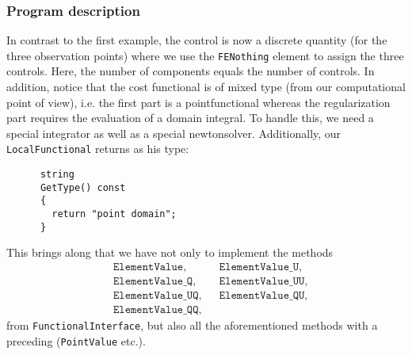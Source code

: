 \subsubsection{Program description}
{
In contrast to the first example, the control is now a discrete quantity (for
the three observation points) where we use the \texttt{FE\underline{}Nothing}
element to assign the three controls. Here, the number of components equals
the number of controls. 
In addition, }notice that the cost functional is of mixed type (from our computational point of view), i.e. the first part is a pointfunctional whereas the regularization part requires the evaluation of a domain integral. To handle this, we need a special integrator as well as a special newtonsolver. Additionally, our \texttt{LocalFunctional} returns as his type:
\begin{verbatim}
      string
      GetType() const
      {
        return "point domain";
      }
\end{verbatim}
This brings along that we have not only to implement {the methods
\begin{align*} 
 &\texttt{ElementValue},&&
 \texttt{ElementValue\_U},\\
 &\texttt{ElementValue\_Q}, &&
 \texttt{ElementValue\_UU},\\
 &\texttt{ElementValue\_UQ},&&
 \texttt{ElementValue\_QU},\\
 &\texttt{ElementValue\_QQ},
\end{align*}}
 from \texttt{FunctionalInterface}, but also all the aforementioned methods with a preceding  (\texttt{PointValue} etc.).

